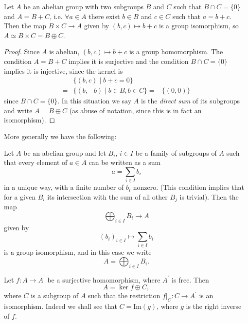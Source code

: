 \begin{lemma}
Let $A$ be an abelian group with two subgroups $B$ and $C$
such that $B \cap C = \{ 0 \}$ and $A = B + C$, i.e.
$\forall a \in A$ there exist $b \in B$ and $c \in C$ such that
$a = b + c$. Then the map $B \times C \to A$ given by
$(b, c) \mapsto b + c$ is a group isomorphism, so
$A \simeq B \times C = B \oplus C$.
\end{lemma}

\begin{proof}
Since $A$ is abelian, $(b, c) \mapsto b + c$ is a group
homomorphism. The condition $A = B + C$ implies it is surjective and
the condition $B \cap C = \{ 0 \}$ implies it is injective, since
the kernel is
\begin{align*}
 & \{ (b, c)  \mid b + c = 0 \} \\
=& \{ (b, -b) \mid b \in B, b \in C \}
=& \{ (0, 0) \}
\end{align*}
since $B \cap C = \{ 0 \}$. In this situation we say $A$ is the
\emph{direct sum} of its subgroups and write $A = B \oplus C$
(as abuse of notation, since this is in fact an isomorphism).
\end{proof}

More generally we have the following:
\begin{lemma}
Let $A$ be an abelian group and let $B_i$, $i \in I$ be a family of
subgroups of $A$ such that every element of $a \in A$ can be written
as a sum
$$
a = \sum_{i \in I} b_i
$$
in a unique way, with a finite number of $b_i$ nonzero.
(This condition implies that for a given $B_i$ its intersection with
 the sum of all other $B_j$ is trivial).
Then the map
$$
\bigoplus_{i \in I} B_i \to A
$$
given by
$$
(b_i)_{i \in I} \mapsto \sum_{i \in I} b_i
$$
is a group isomorphism, and in this case we write
$$
A = \bigoplus_{i \in I} B_i.
$$
\end{lemma}

\begin{lemma}
Let $f : A \to A^\prime$ be a surjective homomorphism, where
$A^\prime$ is free. Then
$$
A = \ker f \oplus C,
$$
where $C$ is a subgroup of $A$ such that the restriction
$f|_C : C \to A^\prime$ is an isomorphism. Indeed we shall see
that $C = \mathrm{Im}(g)$, where $g$ is the right inverse of $f$.
\end{lemma}

